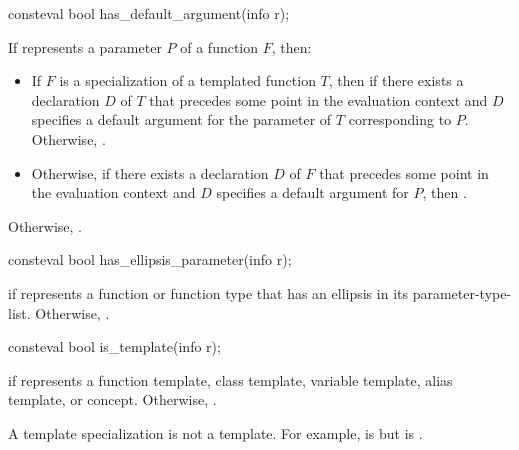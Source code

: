 %
\begin{itemdecl}
consteval bool has_default_argument(info r);
\end{itemdecl}

\begin{itemdescr}
\pnum
\returns
If  represents a parameter $P$ of a function $F$, then:
\begin{itemize}
\item
  If $F$ is a specialization of a templated function $T$,
  then  if there exists a declaration $D$ of $T$
  that precedes some point in the evaluation context
  and $D$ specifies a default argument
  for the parameter of $T$ corresponding to $P$.
  Otherwise, .
\item
  Otherwise, if there exists a declaration $D$ of $F$
  that precedes some point in the evaluation context
  and $D$ specifies a default argument for $P$,
  then .
\end{itemize}
Otherwise, .
\end{itemdescr}

%
\begin{itemdecl}
consteval bool has_ellipsis_parameter(info r);
\end{itemdecl}

\begin{itemdescr}
\pnum
\returns
{} if  represents a function or function type
that has an ellipsis in its parameter-type-list.
Otherwise, .
\end{itemdescr}

%
\begin{itemdecl}
consteval bool is_template(info r);
\end{itemdecl}

\begin{itemdescr}
\pnum
\returns
{} if  represents a
function template,
class template,
variable template,
alias template, or
concept.
Otherwise, .

\pnum
\begin{note}
A template specialization is not a template.
For example,
 is 
but  is .
\end{note}
\end{itemdescr}

